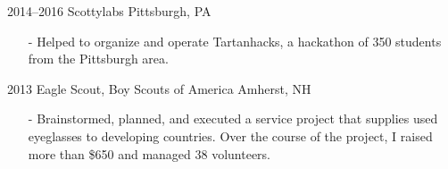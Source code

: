 \documentclass[]{friggeri-cv}
\begin{document}
    \begin{entrylist}
        \entrys
            {2014--2016}
            {Scottylabs}
            {Pittsburgh, PA}
            {\begin{itemize}[leftmargin=*]
                \item[-] Helped to organize and operate Tartanhacks, a hackathon of 350 students from the Pittsburgh area.
            \end{itemize}}
        \entrys
            {2013}
            {Eagle Scout, {\normalfont Boy Scouts of America}}
            {Amherst, NH}
            {\begin{itemize}[leftmargin=*]
                \item[-] Brainstormed, planned, and executed a service project that supplies used eyeglasses to developing countries. Over the course of the project, I raised more than \$650 and managed 38 volunteers.
            \end{itemize}}
    \end{entrylist}
\end{document}
